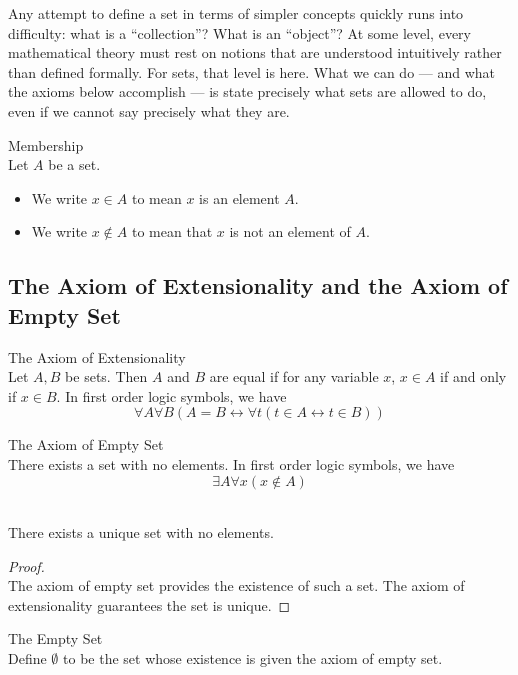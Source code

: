 \documentclass[a4paper]{article}
\begin{document}
Any attempt to define a set in terms of simpler concepts quickly runs into difficulty: what is a “collection”? What is an “object”? At some level, every mathematical theory must rest on notions that are understood intuitively rather than defined formally. For sets, that level is here. What we can do — and what the axioms below accomplish — is state precisely what sets are allowed to do, even if we cannot say precisely what they are. 

\begin{defn}{Membership}{}\\
Let $A$ be a set. 
\begin{itemize}
\item We write $x\in A$ to mean $x$ is an element $A$. 
\item We write $x\notin A$ to mean that $x$ is not an element of $A$. 
\end{itemize}
\end{defn}

\subsection{The Axiom of Extensionality and the Axiom of Empty Set}
\begin{axm}{The Axiom of Extensionality}{}\\
Let $A,B$ be sets. Then $A$ and $B$ are equal if for any variable $x$, $x\in A$ if and only if $x\in B$. In first order logic symbols, we have $$\forall A\forall B(A=B\leftrightarrow\forall t(t\in A\leftrightarrow t\in B))$$ 
\end{axm}

\begin{defn}{The Axiom of Empty Set}{}\\
There exists a set with no elements. In first order logic symbols, we have $$\exists A\forall x(x\notin A)$$
\end{defn}

\begin{prp}{}{}\\
There exists a unique set with no elements. 
\begin{proof}\\
The axiom of empty set provides the existence of such a set. The axiom of extensionality guarantees the set is unique. 
\end{proof}
\end{prp}

\begin{defn}{The Empty Set}{}\\
Define $\emptyset$ to be the set whose existence is given the axiom of empty set. 
\end{defn}
\end{document}
